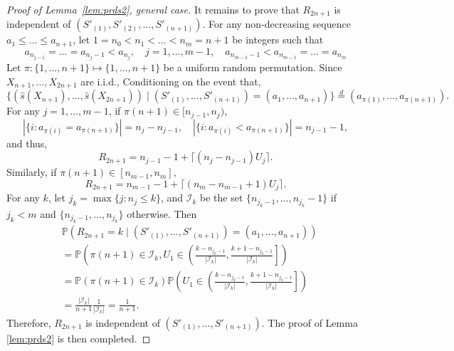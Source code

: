 \documentclass[11pt]{article}
\renewcommand{\P}{\mathbb{P}}
\begin{document}
\begin{proof}[Proof of Lemma~\ref{lem:prds2}, general case]
It remains to prove that $R_{2n+1}$ is independent of $(S'_{(1)}, S'_{(2)}, \ldots, S'_{(n+1)})$. For any non-decreasing sequence $a_{1}\le \ldots\le a_{n+1}$, let $1 = n_0 < n_1 < \ldots < n_m = n+1$ be integers such that
\[a_{n_{j-1}} = \ldots = a_{n_j - 1} < a_{n_j}, \quad j = 1,\ldots, m - 1, \quad a_{n_{m-1}-1} < a_{n_{m-1}} = \ldots = a_{n_{m}}\]
Let $\pi: \{1, \ldots, n+1\}\mapsto \{1, \ldots, n + 1\}$ be a uniform random permutation. Since $X_{n+1}, \ldots, X_{2n+1}$ are i.i.d.,  Conditioning on the event that, 
\[\bigg\{\left(\hat{s}(X_{n+1}), \ldots, \hat{s}(X_{2n+1})\right)\mid (S'_{(1)}, \ldots, S'_{(n+1)}) = (a_1, \ldots, a_{n+1})\bigg\}\stackrel{d}{=}\left(a_{\pi(1)}, \ldots, a_{\pi(n+1)}\right).\]
For any $j = 1,\ldots, m - 1$, if $\pi(n+1)\in [n_{j-1}, n_{j})$, 
\[|\{i: a_{\pi(i)} = a_{\pi(n+1)}\}| = n_{j} - n_{j-1}, \quad |\{i: a_{\pi(i)} < a_{\pi(n+1)}\}| = n_{j-1} - 1,\]
and thus,
\[R_{2n+1} = n_{j-1} - 1 + \lceil (n_{j} - n_{j-1})U_{j}\rceil.\]
Similarly, if $\pi(n+1)\in [n_{m-1}, n_{m}]$,
\[R_{2n+1} = n_{m-1} - 1 + \lceil (n_{m} - n_{m-1} + 1)U_{j}\rceil.\]
For any $k$, let $j_k = \max\{j: n_{j}\le k\}$, and $\mathcal{I}_k$ be the set $\{n_{j_k - 1}, \ldots, n_{j_k} - 1\}$ if $j_k < m$ and $\{n_{j_k - 1}, \ldots, n_{j_k}\}$ otherwise. Then
\begin{align*}
&\P(R_{2n+1} = k\mid (S'_{(1)}, \ldots, S'_{(n+1)}) = (a_1, \ldots, a_{n+1}))\\
& = \P\left(\pi(n+1)\in \mathcal{I}_{k}, U_{1}\in \left(\frac{k - n_{j_k - 1}}{|\mathcal{I}_k|}, \frac{k + 1 - n_{j_k - 1}}{|\mathcal{I}_k|} \right]\right)\\
& = \P\left(\pi(n+1)\in \mathcal{I}_{k}\right)\P\left(U_{1}\in \left(\frac{k  - n_{j_k - 1}}{|\mathcal{I}_{k}|}, \frac{k + 1 - n_{j_k - 1}}{|\mathcal{I}_{k}|} \right]\right)\\
& = \frac{|\mathcal{I}_{k}|}{n+1} \frac{1}{|\mathcal{I}_{k}|} = \frac{1}{n+1}.
\end{align*}
Therefore, $R_{2n+1}$ is independent of $(S'_{(1)}, \ldots, S'_{(n+1)})$. The proof of Lemma \ref{lem:prds2} is then completed. 
\end{proof}


\end{document}
